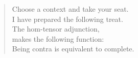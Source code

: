 
\thispagestyle{plain}

\vspace*{7cm}
\begin{verse}
    \hspace{8em}Choose a context and take your seat. \\
    \vspace{5pt}
    \hspace{8em}I have prepared the following treat. \\
    \vspace{5pt}
    \hspace{8em}The hom-tensor adjunction, \\
    \vspace{5pt}
    \hspace{8em}makes the following function: \\
    \vspace{5pt}
    \hspace{8em}Being contra is equivalent to complete. 

\end{verse}